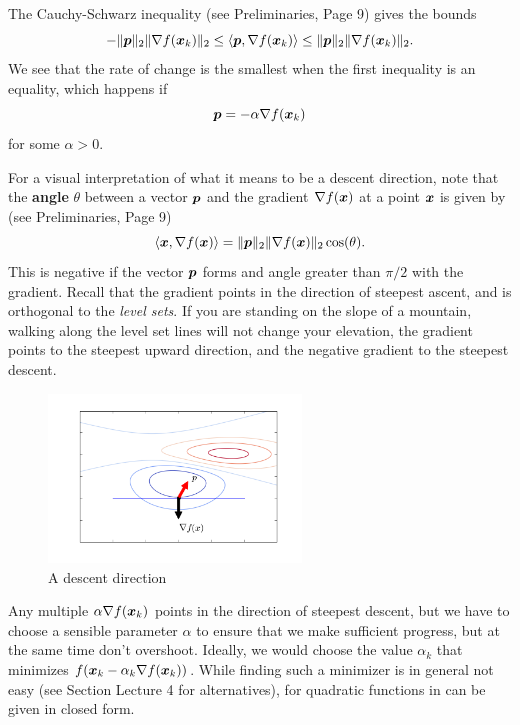 The Cauchy-Schwarz inequality (see Preliminaries, Page 9) gives the bounds
\begin{equation*}
 -\Vert {\bm{p}}\Vert_2 \Vert {\nabla f(\bm{x}_k)}\Vert_2 \leq \langle {\bm{p}}, {\nabla f(\bm{x}_k)} \rangle \leq \Vert {\bm{p}}\Vert_2 \Vert {\nabla f(\bm{x}_k)}\Vert_2.
\end{equation*}
We see that the rate of change is the smallest when the first inequality is an equality, which happens if 
\begin{equation*}
 \bm{p} = -\alpha \nabla f(\bm{x}_k)
\end{equation*}
for some $\alpha>0$. 

For a visual interpretation of what it means to be a descent direction, note that the \textbf{angle} $\theta$ between a vector $\bm{p}$ and the gradient $\nabla f(\bm{x})$ at a point $\bm{x}$ is given by (see Preliminaries, Page 9)
\begin{equation*}
  \langle {\bm{x}}, {\nabla f(\bm{x})} \rangle = \Vert {\bm{p}}\Vert_2\Vert {\nabla f(\bm{x})}\Vert_2 \cos(\theta).
\end{equation*}
This is negative if the vector $\bm{p}$ forms and angle greater than $\pi/2$ with the gradient. Recall that the gradient points in the direction of steepest ascent, and is orthogonal to the {\em level sets}. If you are standing on the slope of a mountain, walking along the level set lines will not change your elevation, the gradient points to the steepest upward direction, and the negative gradient to the steepest descent.

\begin{figure}[h!]
\centering
\includegraphics[width=0.6\textwidth]{images/descent.png}
\caption{A descent direction}
\end{figure}

Any multiple $\alpha \nabla f(\bm{x}_k)$ points in the direction of steepest descent, but we have to choose a sensible parameter $\alpha$ to ensure that we make sufficient progress, but at the same time don't overshoot. Ideally, we would choose the value $\alpha_k$ that minimizes $f(\bm{x}_k-\alpha_k \nabla f(\bm{x}_k))$. While finding such a minimizer is in general not easy (see Section Lecture 4 for alternatives), for quadratic functions in can be given in closed form.

